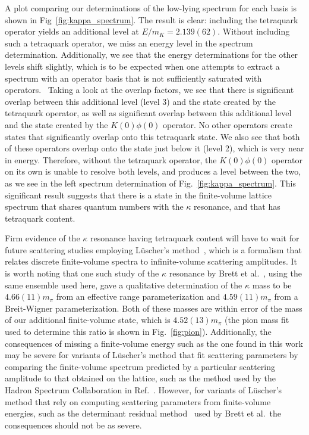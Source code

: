 A plot comparing our determinations of the low-lying spectrum for each basis is shown in Fig~\ref{fig:kappa_spectrum}. The result is clear: including the tetraquark operator yields an additional level at $E/m_K = 2.139(62)$. Without including such a tetraquark operator, we miss an energy level in the spectrum determination. Additionally, we see that the energy determinations for the other levels shift slightly, which is to be expected when one attempts to extract a spectrum with an operator basis that is not sufficiently saturated with operators.~\cite{Dudek:2012xn} Taking a look at the overlap factors, we see that there is significant overlap between this additional level (level 3) and the state created by the tetraquark operator, as well as significant overlap between this additional level and the state created by the $K(0)\phi(0)$ operator. No other operators create states that significantly overlap onto this tetraquark state. We also see that both of these operators overlap onto the state just below it (level 2), which is very near in energy. Therefore, without the tetraquark operator, the $K(0)\phi(0)$ operator on its own is unable to resolve both levels, and produces a level between the two, as we see in the left spectrum determination of Fig.~\ref{fig:kappa_spectrum}. This significant result suggests that there is a state in the finite-volume lattice spectrum that shares quantum numbers with the $\kappa$ resonance, and that has tetraquark content.

Firm evidence of the $\kappa$ resonance having tetraquark content will have to wait for future scattering studies employing L\"uscher's method~\cite{Luscher:1990ck}, which is a formalism that relates discrete finite-volume spectra to infinite-volume scattering amplitudes. It is worth noting that one such study of the $\kappa$ resonance by Brett et al.~\cite{Brett:2018jqw}, using the same ensemble used here, gave a qualitative determination of the $\kappa$ mass to be $4.66(11)m_\pi$ from an effective range parameterization and $4.59(11)m_\pi$ from  a Breit-Wigner parameterization. Both of these masses are within error of the mass of our additional finite-volume state, which is $4.52(13)m_\pi$ (the pion mass fit used to determine this ratio is shown in Fig.~\ref{fig:pion}). Additionally, the consequences of missing a finite-volume energy such as the one found in this work may be severe for variants of L\"uscher's method that fit scattering parameters by comparing the finite-volume spectrum predicted by a particular scattering amplitude to that obtained on the lattice, such as the method used by the Hadron Spectrum Collaboration in Ref.~\cite{Wilson:2015dqa}. However, for variants of L\"uscher's method that rely on computing scattering parameters from finite-volume energies, such as the determinant residual method~\cite{Morningstar:2017spu} used by Brett et al.\, the consequences should not be as severe.

